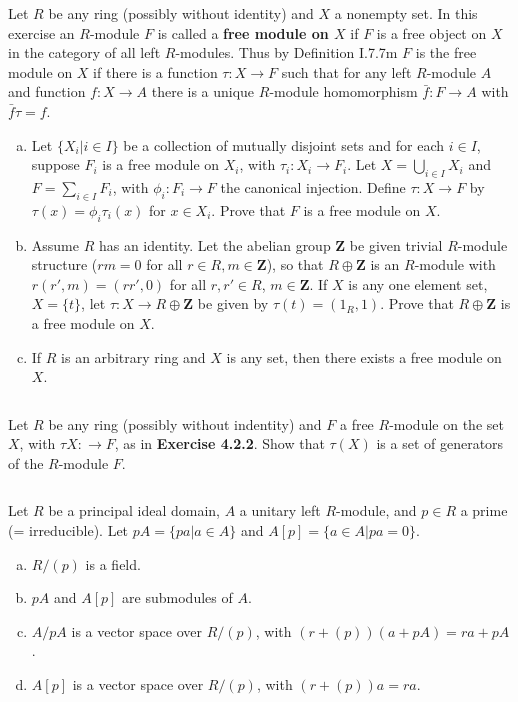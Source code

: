 $$ $$

\begin{ex}
    Let $R$ be any ring (possibly without identity) and $X$ a nonempty set. In this exercise an $R$-module $F$ is called a \textbf{free module on $X$} if $F$ is a free object on $X$ in the category of all left $R$-modules. Thus by Definition I.7.7m $F$ is the free module on $X$ if there is a function $\tau:X\to F$ such that for any left $R$-module $A$ and function $f:X\to A$ there is a unique $R$-module homomorphism $\bar{f}:F\to A$ with $\bar{f}\tau=f$.
    \begin{enumerate}[(a)]
        \item Let $\{X_{i}|i\in I\}$ be a collection of mutually disjoint sets and for each $i\in I$, suppose $F_{i}$ is a free module on $X_{i}$, with $\tau_{i}:X_{i}\to F_{i}$. Let $X=\bigcup\limits_{i\in I}X_{i}$ and $F=\sum\limits_{i\in I}F_{i}$, with $\phi_{i}:F_{i}\to F$ the canonical injection. Define $\tau:X\to F$ by $\tau(x)=\phi_{i}\tau_{i}(x)$ for $x\in X_{i}$. Prove that $F$ is a free module on $X$.
        \item Assume $R$ has an identity. Let the abelian group $\mathbf{Z}$ be given trivial $R$-module structure ($rm=0$ for all $r\in R, m\in\mathbf{Z}$), so that $R\oplus\mathbf{Z}$ is an $R$-module with $r(r',m)=(rr',0)$ for all $r,r'\in R$, $m\in \mathbf{Z}$. If $X$ is any one element set, $X=\{t\}$, let $\tau:X\to R\oplus\mathbf{Z}$ be given by $\tau(t)=(1_{R},1)$. Prove that $R\oplus\mathbf{Z}$ is a free module on $X$.
        \item If $R$ is an arbitrary ring and $X$ is any set, then there exists a free module on $X$.
    \end{enumerate}
\end{ex}

$$ $$

\begin{ex}
    Let $R$ be any ring (possibly without indentity) and $F$ a free $R$-module on the set $X$, with $\tau X:\to F$, as in \textbf{Exercise 4.2.2}. Show that $\tau(X)$ is a set of generators of the $R$-module $F$.
\end{ex}

$$ $$

\begin{ex}
    Let $R$ be a principal ideal domain, $A$ a unitary left $R$-module, and $p\in R$ a prime (= irreducible). Let $pA=\{pa|a\in A\}$ and $A[p]=\{a\in A|pa=0\}$.
    \begin{enumerate}[(a)]
        \item $R/(p)$ is a field.
        \item $pA$ and $A[p]$ are submodules of $A$.
        \item $A /pA$ is a vector space over $R /(p)$, with $(r+(p))(a+pA)=ra+pA$.
        \item $A[p]$ is a vector space over $R /(p)$, with $(r+(p))a=ra$.
    \end{enumerate}
\end{ex}

